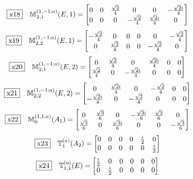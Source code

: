 \documentclass[fleqn,10pt,landscape]{jsarticle}
\begin{document}
\begin{dmath*}
\fbox{x18}\quad \mathbb{M}_{2,1}^{(1,-1;a)}(E,1)=\begin{bmatrix} 0 & 0 & \frac{\sqrt{2}}{4} & 0 & 0 & - \frac{\sqrt{2} i}{4} \\ 0 & 0 & 0 & - \frac{\sqrt{2}}{4} & \frac{\sqrt{2} i}{4} & 0 \end{bmatrix}
\end{dmath*}
\begin{dmath*}
\fbox{x19}\quad \mathbb{M}_{2,2}^{(1,-1;a)}(E,1)=\begin{bmatrix} - \frac{\sqrt{2}}{4} & 0 & 0 & 0 & 0 & - \frac{\sqrt{2}}{4} \\ 0 & \frac{\sqrt{2}}{4} & 0 & 0 & - \frac{\sqrt{2}}{4} & 0 \end{bmatrix}
\end{dmath*}
\begin{dmath*}
\fbox{x20}\quad \mathbb{M}_{2,1}^{(1,-1;a)}(E,2)=\begin{bmatrix} 0 & \frac{\sqrt{2}}{4} & 0 & \frac{\sqrt{2} i}{4} & 0 & 0 \\ \frac{\sqrt{2}}{4} & 0 & - \frac{\sqrt{2} i}{4} & 0 & 0 & 0 \end{bmatrix}
\end{dmath*}
\begin{dmath*}
\fbox{x21}\quad \mathbb{M}_{2,2}^{(1,-1;a)}(E,2)=\begin{bmatrix} 0 & \frac{\sqrt{2} i}{4} & 0 & - \frac{\sqrt{2}}{4} & 0 & 0 \\ - \frac{\sqrt{2} i}{4} & 0 & - \frac{\sqrt{2}}{4} & 0 & 0 & 0 \end{bmatrix}
\end{dmath*}
\begin{dmath*}
\fbox{x22}\quad \mathbb{M}_{0}^{(1,1;a)}(A_{1})=\begin{bmatrix} 0 & \frac{\sqrt{3}}{6} & 0 & - \frac{\sqrt{3} i}{6} & \frac{\sqrt{3}}{6} & 0 \\ \frac{\sqrt{3}}{6} & 0 & \frac{\sqrt{3} i}{6} & 0 & 0 & - \frac{\sqrt{3}}{6} \end{bmatrix}
\end{dmath*}
\begin{dmath*}
\fbox{x23}\quad \mathbb{T}_{1}^{(a)}(A_{2})=\begin{bmatrix} 0 & 0 & 0 & 0 & \frac{i}{2} & 0 \\ 0 & 0 & 0 & 0 & 0 & \frac{i}{2} \end{bmatrix}
\end{dmath*}
\begin{dmath*}
\fbox{x24}\quad \mathbb{T}_{1,1}^{(a)}(E)=\begin{bmatrix} \frac{i}{2} & 0 & 0 & 0 & 0 & 0 \\ 0 & \frac{i}{2} & 0 & 0 & 0 & 0 \end{bmatrix}
\end{dmath*}
\end{document}
